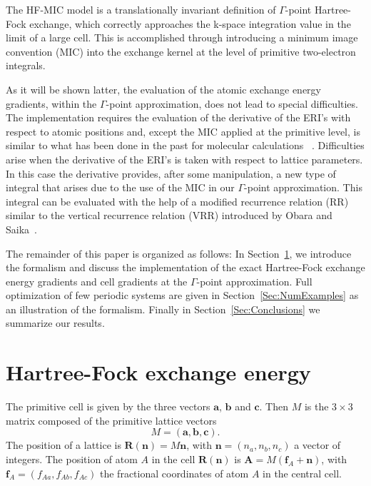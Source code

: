 \documentclass[prl,twocolumn,showpacs,twocolumngrid,superbib]{revtex4}
\begin{document}
The HF-MIC model is a translationally invariant definition of $\Gamma$-point Hartree-Fock exchange, 
which correctly approaches the k-space integration value in the limit of a
large cell. This is accomplished through introducing a 
minimum image convention (MIC) into the exchange kernel
at the level of primitive two-electron integrals.

As it will be shown latter, the evaluation of the atomic exchange energy gradients,
within the $\Gamma$-point approximation,
does not lead to special difficulties. The implementation requires the evaluation
of the derivative of the ERI's with respect to atomic positions and, 
except the MIC applied at the primitive level, is
similar to what has been done in the past for molecular calculations 
~\cite{SObara86,MGordon88,KIshida91,THelgaker92,KIshida93}.
Difficulties arise when the derivative of the ERI's is taken with respect to lattice 
parameters. In this case the derivative provides, after some manipulation, 
a new type of integral that
arises due to the use of the MIC in our $\Gamma$-point approximation. This integral 
can be evaluated with the help of a modified recurrence relation (RR) similar to the
vertical recurrence relation (VRR) introduced by Obara and Saika~\cite{SObara86}.

The remainder of this paper is organized as follows:
In Section~\ref{Sec:Formalism}, we introduce the formalism and discuss
the implementation of the exact Hartree-Fock exchange energy gradients and cell gradients 
at the $\Gamma$-point approximation. Full optimization of few periodic systems are given
in Section~\ref{Sec:NumExamples} as an illustration of the formalism.
Finally in Section~\ref{Sec:Conclusions} we summarize our results.


\section{Hartree-Fock exchange energy}\label{Sec:Formalism}
The primitive cell is given by the three vectors $\mathbf{a}$, 
$\mathbf{b}$ and $\mathbf{c}$. Then $M$ is the $3\times3$ matrix composed 
of the primitive lattice vectors
\begin{equation}
  M=(\mathbf{a},\mathbf{b},\mathbf{c}).
\end{equation}
The position of a lattice is $\mathbf{R(n)}=M\mathbf{n}$,
with $\mathbf{n}=(n_a,n_b,n_c)$ a vector of integers.
The position of atom $A$ in the cell $\mathbf{R(n)}$ is $\mathbf{A}=M(\mathbf{f}_A+\mathbf{n})$,
with $\mathbf{f}_A=(f_{Aa},f_{Ab},f_{Ac})$ the fractional coordinates of 
atom $A$ in the central cell. 
\end{document}
